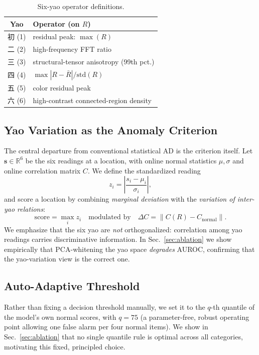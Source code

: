 \documentclass[journal,10pt]{IEEEtran}
\begin{document}
\begin{table}[t]
\centering
\caption{Six-yao operator definitions.}
\label{tab:yao}
\begin{tabular}{cl}
\toprule
Yao & Operator (on $R$) \\
\midrule
初 (1) & residual peak: $\max(R)$ \\
二 (2) & high-frequency FFT ratio \\
三 (3) & structural-tensor anisotropy (99th pct.) \\
四 (4) & $\max|R-\bar R| / \mathrm{std}(R)$ \\
五 (5) & color residual peak \\
六 (6) & high-contrast connected-region density \\
\bottomrule
\end{tabular}
\end{table}

\subsection{Yao Variation as the Anomaly Criterion}
\label{sec:yaobian}
The central departure from conventional statistical AD is the criterion
itself. Let $\mathbf{s} \in \mathbb{R}^6$ be the six readings at a
location, with online normal statistics $\mu, \sigma$ and online
correlation matrix $C$. We define the standardized reading
\begin{equation}
z_i = \left|\frac{s_i - \mu_i}{\sigma_i}\right|,
\end{equation}
and score a location by combining \emph{marginal deviation} with the
\emph{variation of inter-yao relations}:
\begin{equation}
\mathrm{score} = \max_i z_i \quad\text{modulated by}\quad
\Delta C = \|C(R) - C_{\text{normal}}\|.
\end{equation}
We emphasize that the six yao are \emph{not} orthogonalized: correlation
among yao readings carries discriminative information. In
Sec.~\ref{sec:ablation} we show empirically that PCA-whitening the yao
space \emph{degrades} AUROC, confirming that the yao-variation view is the
correct one.

\subsection{Auto-Adaptive Threshold}
Rather than fixing a decision threshold manually, we set it to the
$q$-th quantile of the model's own normal scores, with $q{=}75$
(a parameter-free, robust operating point allowing one false alarm per
four normal items). We show in Sec.~\ref{sec:ablation} that no single
quantile rule is optimal across all categories, motivating this fixed,
principled choice.
\end{document}
